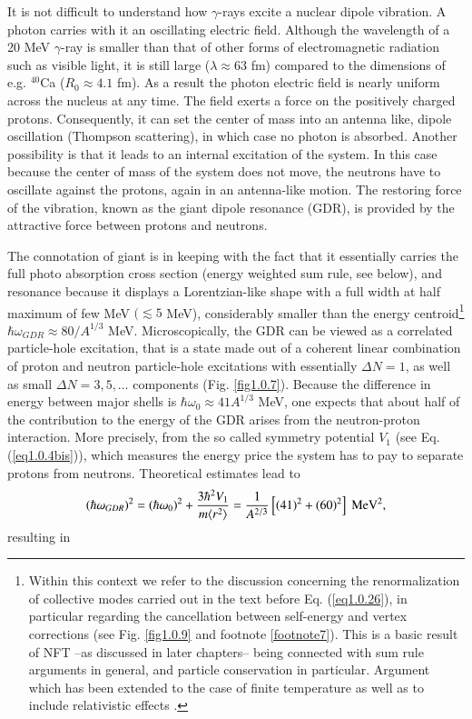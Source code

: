 It is not difficult to understand how $\gamma$-rays excite a nuclear dipole vibration. A photon carries with it an oscillating electric field. Although the wavelength of a 20 MeV $\gamma$-ray is smaller than that of other forms of electromagnetic radiation such as visible light, it is still large ($\lambda\approx63$ fm) compared to the dimensions of e.g. $^{40}$Ca ($R_0\approx4.1$ fm). As a result the photon electric field is nearly uniform across the nucleus at any time. The field exerts a force on the positively charged protons. Consequently, it can set the center of mass into an antenna like, dipole oscillation (Thompson scattering), in which case no photon is absorbed. Another possibility is that it leads to an internal excitation of the system. In this case because the center of mass of the system does not move, the neutrons have to oscillate against the protons, again in an antenna-like motion. The restoring force of the vibration, known as the giant dipole resonance (GDR), is provided by the attractive force between protons and neutrons.

The connotation of giant is in keeping with the fact that it essentially carries the full photo absorption cross section (energy weighted sum rule, see below), and resonance because it displays a Lorentzian-like shape with a full width at half maximum of few MeV $(\lesssim5$ MeV), considerably  smaller than the energy centroid\footnote{Within this context we refer to the discussion concerning the renormalization of collective modes carried out in the text before Eq. (\ref{eq1.0.26}), in particular regarding the cancellation between self-energy and vertex corrections (see Fig. \ref{fig1.0.9} and footnote \ref{footnote7}). This is a basic result of NFT --as discussed in later chapters-- being connected with sum rule arguments in general, and particle conservation in particular. Argument which has been extended to the case of finite temperature as well as to include relativistic effects \cite{Ward:50,Nambu:60,Bortignon:81,Bertsch:83,Bortignon:98,Litvinova:18,Wibowo:19}.} $\hbar\omega_{GDR}\approx80/A^{1/3}$ MeV. Microscopically, the GDR can be viewed as a correlated particle-hole excitation, that is a state made out of a coherent linear combination of proton and neutron particle-hole excitations with essentially $\Delta N=1$, as well as small $\Delta N=3,5,\dots$ components (Fig. \ref{fig1.0.7}). Because the difference in energy between major shells is $\hbar\omega_0\approx41A^{1/3}$ MeV, one expects that about half of the contribution to the energy of the GDR arises from the neutron-proton interaction. More precisely, from the so called  symmetry potential $V_1$ (see Eq.  (\ref{eq1.0.4bis})), which measures the energy price the system has to pay to separate protons from neutrons. Theoretical estimates lead to 
\begin{align}\label{eq0.1.106}
(\hbar\omega_{GDR})^2=(\hbar\omega_0)^2+\frac{3\hbar^2V_1}{m\langle {r^2} \rangle}=\frac{1}{A^{2/3}}\left[(41)^2+(60)^2\right]\text{ MeV}^2,
\end{align}
resulting in

